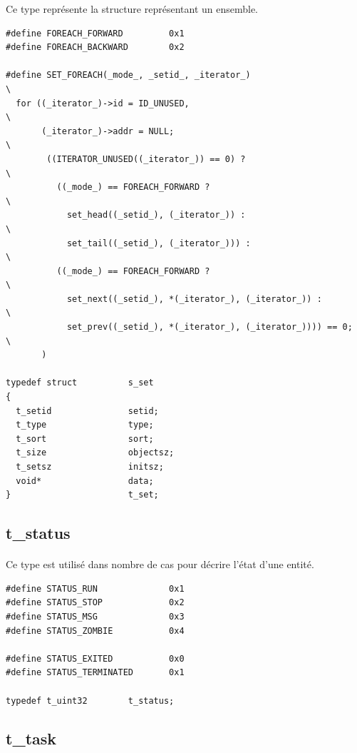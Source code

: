 \documentclass[10pt,a4wide]{article}
\begin{document}
Ce type repr\'esente la structure repr\'esentant un ensemble.

\begin{verbatim}
#define FOREACH_FORWARD         0x1
#define FOREACH_BACKWARD        0x2

#define SET_FOREACH(_mode_, _setid_, _iterator_)                        \
  for ((_iterator_)->id = ID_UNUSED,                                    \
       (_iterator_)->addr = NULL;                                       \
        ((ITERATOR_UNUSED((_iterator_)) == 0) ?                         \
          ((_mode_) == FOREACH_FORWARD ?                                \
            set_head((_setid_), (_iterator_)) :                         \
            set_tail((_setid_), (_iterator_))) :                        \
          ((_mode_) == FOREACH_FORWARD ?                                \
            set_next((_setid_), *(_iterator_), (_iterator_)) :          \
            set_prev((_setid_), *(_iterator_), (_iterator_)))) == 0;    \
       )

typedef struct          s_set
{
  t_setid               setid;
  t_type                type;
  t_sort                sort;
  t_size                objectsz;
  t_setsz               initsz;
  void*                 data;
}                       t_set;
\end{verbatim}

\subsection{t\_status}

\paragraph{}

Ce type est utilis\'e dans nombre de cas pour d\'ecrire l'\'etat
d'une entit\'e.

\begin{verbatim}
#define STATUS_RUN              0x1
#define STATUS_STOP             0x2
#define STATUS_MSG              0x3
#define STATUS_ZOMBIE           0x4

#define STATUS_EXITED           0x0
#define STATUS_TERMINATED       0x1

typedef t_uint32        t_status;
\end{verbatim}

\subsection{t\_task}
\end{document}
